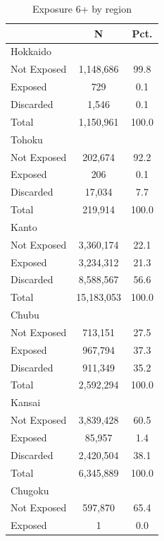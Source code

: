 \begin{table}[htbp]\centering
\def\sym#1{\ifmmode^{#1}\else\(^{#1}\)\fi}
\caption{Exposure 6+ by region}
\begin{tabular}{l*{1}{cc}}
\toprule
            &           N&        Pct.\\
\midrule
Hokkaido    &            &            \\
Not Exposed &   1,148,686&        99.8\\
Exposed     &         729&         0.1\\
Discarded   &       1,546&         0.1\\
Total       &   1,150,961&       100.0\\
\midrule
Tohoku      &            &            \\
Not Exposed &     202,674&        92.2\\
Exposed     &         206&         0.1\\
Discarded   &      17,034&         7.7\\
Total       &     219,914&       100.0\\
\midrule
Kanto       &            &            \\
Not Exposed &   3,360,174&        22.1\\
Exposed     &   3,234,312&        21.3\\
Discarded   &   8,588,567&        56.6\\
Total       &  15,183,053&       100.0\\
\midrule
Chubu       &            &            \\
Not Exposed &     713,151&        27.5\\
Exposed     &     967,794&        37.3\\
Discarded   &     911,349&        35.2\\
Total       &   2,592,294&       100.0\\
\midrule
Kansai      &            &            \\
Not Exposed &   3,839,428&        60.5\\
Exposed     &      85,957&         1.4\\
Discarded   &   2,420,504&        38.1\\
Total       &   6,345,889&       100.0\\
\midrule
Chugoku     &            &            \\
Not Exposed &     597,870&        65.4\\
Exposed     &           1&         0.0\\

\end{tabular}
\end{table}
